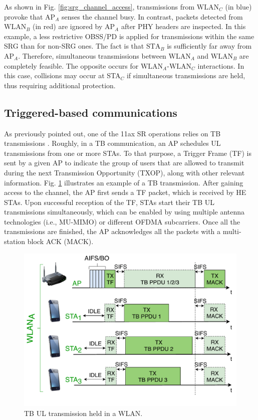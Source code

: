 \documentclass[comsoc]{IEEEtran}
\begin{document}
	As shown in Fig. \ref{fig:srg_channel_access}, transmissions from $\text{WLAN}_C$ (in blue) provoke that $\text{AP}_A$ senses the channel busy. In contrast, packets detected from $\text{WLAN}_B$ (in red) are ignored by $\text{AP}_A$ after PHY headers are inspected. In this example, a less restrictive OBSS/PD is applied for transmissions within the same SRG than for non-SRG ones. The fact is that $\text{STA}_B$ is sufficiently far away from $\text{AP}_A$. Therefore, simultaneous transmissions between $\text{WLAN}_A$ and $\text{WLAN}_B$ are completely feasible. The opposite occurs for $\text{WLAN}_A$-$\text{WLAN}_C$ interactions. In this case, collisions may occur at STA$_C$ if simultaneous transmissions are held, thus requiring additional protection.
	
	\subsection{Triggered-based communications}
	\label{section:tb_communication}
	As previously pointed out, one of the 11ax SR operations relies on TB transmissions \cite{bellalta2019ap}. Roughly, in a TB communication, an AP schedules UL transmissions from one or more STAs. To that purpose, a Trigger Frame (TF) is sent by a given AP to indicate the group of users that are allowed to transmit during the next Transmission Opportunity (TXOP), along with other relevant information. Fig. \ref{fig:TB_transmission_example} illustrates an example of a TB transmission. After gaining access to the channel, the AP first sends a TF packet, which is received by HE STAs. Upon successful reception of the TF, STAs start their TB UL transmissions simultaneously, which can be enabled by using multiple antenna technologies (i.e., MU-MIMO) or different OFDMA subcarriers. Once all the transmissions are finished, the AP acknowledges all the packets with a multi-station block ACK (MACK).
	\begin{figure}[ht!]
		\centering
		\includegraphics[width=\columnwidth]{fig_8}
		\caption{TB UL transmission held in a WLAN.}
		\label{fig:TB_transmission_example}
	\end{figure}
	
\end{document}
